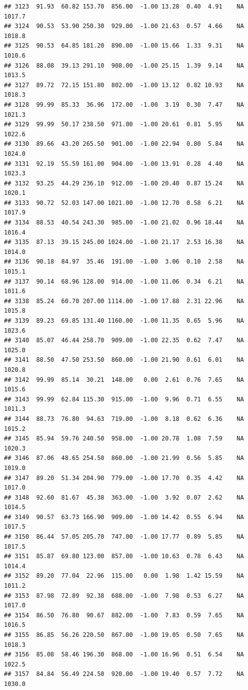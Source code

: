 \documentclass{article}\usepackage{graphicx, color}
\makeatletter
\newenvironment{kframe}{%
 \def\at@end@of@kframe{}%
 \ifinner\ifhmode%
  \def\at@end@of@kframe{\end{minipage}}%
  \begin{minipage}{\columnwidth}%
 \fi\fi%
 \def\FrameCommand##1{\hskip\@totalleftmargin \hskip-\fboxsep
 \colorbox{shadecolor}{##1}\hskip-\fboxsep
     \hskip-\linewidth \hskip-\@totalleftmargin \hskip\columnwidth}%
 \MakeFramed {\advance\hsize-\width
   \@totalleftmargin\z@ \linewidth\hsize
   \@setminipage}}%
 {\par\unskip\endMakeFramed%
 \at@end@of@kframe}
\newenvironment{knitrout}{}{} %
\makeatother
\begin{document}
\begin{knitrout}
\begin{kframe}
\begin{verbatim}
## 3123  91.93  60.82 153.70  856.00  -1.00 13.28  0.40  4.91    NA 1017.7
## 3124  90.53  53.90 250.30  929.00  -1.00 21.63  0.57  4.66    NA 1018.8
## 3125  90.53  64.85 181.20  890.00  -1.00 15.66  1.33  9.31    NA 1010.6
## 3126  88.08  39.13 291.10  908.00  -1.00 25.15  1.39  9.14    NA 1013.5
## 3127  89.72  72.15 151.80  802.00  -1.00 13.12  0.82 10.93    NA 1018.3
## 3128  99.99  85.33  36.96  172.00  -1.00  3.19  0.30  7.47    NA 1021.3
## 3129  99.99  50.17 238.50  971.00  -1.00 20.61  0.81  5.95    NA 1022.6
## 3130  89.66  43.20 265.50  901.00  -1.00 22.94  0.80  5.84    NA 1024.0
## 3131  92.19  55.59 161.00  904.00  -1.00 13.91  0.28  4.40    NA 1023.3
## 3132  93.25  44.29 236.10  912.00  -1.00 20.40  0.87 15.24    NA 1020.1
## 3133  90.72  52.03 147.00 1021.00  -1.00 12.70  0.58  6.21    NA 1017.9
## 3134  88.53  40.54 243.30  985.00  -1.00 21.02  0.96 18.44    NA 1016.4
## 3135  87.13  39.15 245.00 1024.00  -1.00 21.17  2.53 16.38    NA 1014.0
## 3136  90.18  84.97  35.46  191.00  -1.00  3.06  0.10  2.58    NA 1015.1
## 3137  90.14  68.96 128.00  914.00  -1.00 11.06  0.34  6.21    NA 1011.6
## 3138  85.24  60.70 207.00 1114.00  -1.00 17.88  2.31 22.96    NA 1015.8
## 3139  89.23  69.85 131.40 1160.00  -1.00 11.35  0.65  5.96    NA 1023.6
## 3140  85.07  46.44 258.70  909.00  -1.00 22.35  0.62  7.47    NA 1025.0
## 3141  88.50  47.50 253.50  860.00  -1.00 21.90  0.61  6.01    NA 1020.8
## 3142  99.99  85.14  30.21  148.00   0.00  2.61  0.76  7.65    NA 1015.6
## 3143  99.99  62.84 115.30  915.00  -1.00  9.96  0.71  6.55    NA 1011.3
## 3144  88.73  76.80  94.63  719.00  -1.00  8.18  0.62  6.36    NA 1015.2
## 3145  85.94  59.76 240.50  958.00  -1.00 20.78  1.08  7.59    NA 1020.3
## 3146  87.06  48.65 254.50  860.00  -1.00 21.99  0.56  5.85    NA 1019.0
## 3147  89.20  51.34 204.90  779.00  -1.00 17.70  0.35  4.42    NA 1017.0
## 3148  92.60  81.67  45.38  363.00  -1.00  3.92  0.07  2.62    NA 1014.5
## 3149  90.57  63.73 166.90  909.00  -1.00 14.42  0.55  6.94    NA 1017.5
## 3150  86.44  57.05 205.70  747.00  -1.00 17.77  0.89  5.85    NA 1017.5
## 3151  85.87  69.80 123.00  857.00  -1.00 10.63  0.78  6.43    NA 1014.4
## 3152  89.20  77.04  22.96  115.00   0.00  1.98  1.42 15.59    NA 1011.2
## 3153  87.98  72.89  92.38  688.00  -1.00  7.98  0.53  6.27    NA 1017.0
## 3154  86.50  76.80  90.67  882.00  -1.00  7.83  0.59  7.65    NA 1016.5
## 3155  86.85  56.26 220.50  867.00  -1.00 19.05  0.50  7.65    NA 1018.3
## 3156  85.08  58.46 196.30  868.00  -1.00 16.96  0.51  6.54    NA 1022.5
## 3157  84.84  56.49 224.50  920.00  -1.00 19.40  0.57  7.72    NA 1030.0

\end{verbatim}
\end{kframe}
\end{knitrout}
\end{document}
